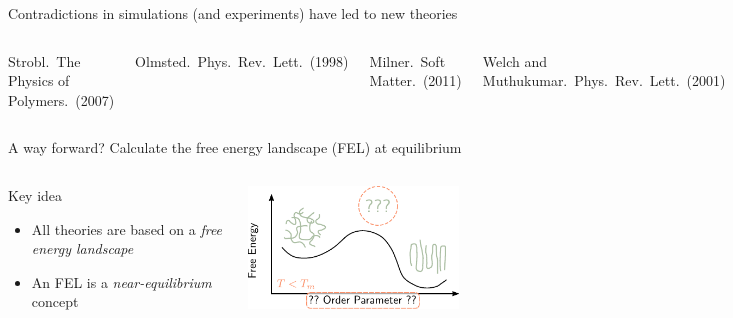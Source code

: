 \documentclass[aspectratio=169]{beamer}
\begin{document}
\begin{frame}[c]{Contradictions in simulations (and experiments) have led to new theories}
\begin{columns}[T]
    \vspace{0.7\baselineskip}
    {\scriptsize 
    Strobl.~The Physics of Polymers.~(2007)\par
    Olmsted.~Phys.~Rev.~Lett.~(1998)\par
    Milner.~Soft Matter.~(2011)\par
    Welch and Muthukumar.~Phys.~Rev.~Lett.~(2001)\par
    }
  
  \end{columns}

\end{frame}

\begin{frame}[c]{A way forward? Calculate the free energy landscape (FEL) at equilibrium}

  \begin{columns}[T, onlytextwidth]
  

    \centering

    \vspace{-0.5\baselineskip}
    \begin{block}{Key idea}
      \begin{itemize}
        \item All theories are based on a \emph{free energy landscape}
        \item An FEL is a \emph{near-equilibrium} concept
      \end{itemize}
    \end{block}

    \centering
    \vspace{-12pt}
    \includegraphics[width=0.8\textwidth]{figs/fig-key_idea_shorter.pdf}
  

\end{columns}
\end{frame}
\end{document}
